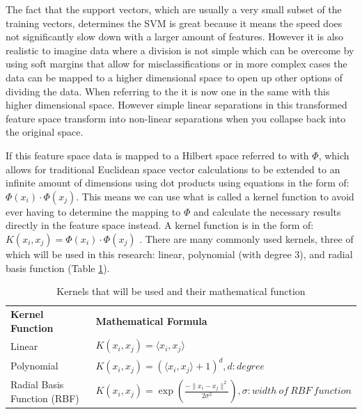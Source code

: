 The fact that the support vectors, which are usually a very small subset of the training vectors, determines the SVM is great because it means the speed does not significantly slow down with a larger amount of features.  However it is also realistic to imagine data where a division is not simple which can be overcome by using soft margins that allow for misclassifications or in more complex cases the data can be mapped to a higher dimensional space to open up other options of dividing the data.  When referring to the  it is now one in the same with this higher dimensional space.  However simple linear separations in this transformed feature space transform into non-linear separations when you collapse back into the original space.

If this feature space data is mapped to a Hilbert space referred to with $\Phi$, which allows for traditional Euclidean space vector calculations to be extended to an infinite amount of dimensions using dot products using equations in the form of: $\Phi\left(x_i \right)\cdot\Phi\left(x_j \right)$.  This means we can use what is called a kernel function to avoid ever having to determine the mapping to $\Phi$ and calculate the necessary results directly in the feature space instead.  A kernel function is in the form of: $K(x_{i},x_{j}) = \Phi(x_i) \cdot \Phi(x_j)$ \cite{supervisedMachineLearning}.  There are many commonly used kernels, three of which will be used in this research: linear, polynomial (with degree 3), and radial basis function (Table \ref{tab:kernels}).

\begin{table}[h]
	\centering
	\begin{tabular}{|p{1.5in}|p{4.5in}|}
	\hline
		\textbf{Kernel Function} & \textbf{Mathematical Formula}\\
	\hhline{|=|=|}
		Linear  & $K(x_{i},x_{j}) = \langle x_{i},x_{j}\rangle$ \\
	\hline
		Polynomial & $K(x_{i},x_{j}) = (\langle x_{i},x_{j}\rangle + 1)^d, d: degree$ \\
	\hline
		Radial Basis Function (RBF) & $K(x_{i},x_{j}) = \exp\left(\frac{- \parallel x_i - x_j \parallel^2}{2\sigma^2} \right), \sigma : width\ of\ RBF\ function$ \\
	\hline
	\end{tabular}
	\caption{Kernels that will be used and their mathematical function \cite{intrusionDetectionCostBased}}
	\label{tab:kernels}
\end{table}


